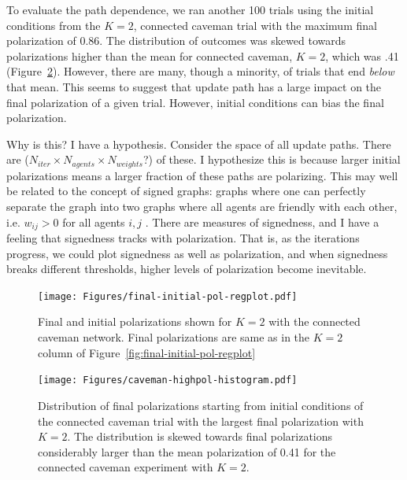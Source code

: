\documentclass[11pt,letterpaper]{article}
\begin{document}
To evaluate the path dependence, we ran another 100 trials using the initial
conditions from the $K=2$, connected caveman trial
with the maximum final polarization of 0.86. The distribution of outcomes was
skewed towards polarizations higher than the mean for connected caveman, $K=2$,
which was .41 (Figure~\ref{fig:highpol-histogram}). However, there are many,
though a minority, of trials that end \emph{below} that mean. This seems to
suggest that update path has a large impact on the final polarization of a
given trial. However, initial conditions can bias the final polarization. 

Why is this? I have a hypothesis. Consider the space of all update paths. 
There are ($N_{iter} \times N_{agents} \times N_{weights}$?) of these.
I hypothesize this is because larger initial polarizations means a larger
fraction of these paths are polarizing. This may well be related to the 
concept of signed graphs: graphs where one can perfectly separate the graph
into two graphs where all agents are friendly with each other, i.e. 
$w_{ij} > 0$ for all agents $i,j$ \cite{Altafini2012}. There are measures of
signedness, and I have a feeling that signedness tracks with polarization.
That is, as the iterations progress, we could plot signedness as well as 
polarization, and when signedness breaks different thresholds, higher levels of
polarization become inevitable.

\begin{figure}[h!]
  \centering
    \texttt{[image: Figures/final-initial-pol-regplot.pdf]}
  \caption{Final and initial polarizations shown for $K=2$ with the connected 
    caveman network. Final polarizations are same as in the $K=2$ column of 
    Figure~\ref{fig:final-initial-pol-regplot}}
  \label{fig:average-trial-caveman-over-k}
\end{figure}

\begin{figure}[h!]
  \centering
    \texttt{[image: Figures/caveman-highpol-histogram.pdf]}
  \caption{Distribution of final polarizations starting from initial conditions
  of the connected caveman trial with the largest final polarization with $K=2$.
  The distribution is skewed towards final polarizations considerably larger
  than the mean polarization of 0.41 for the connected caveman experiment
  with $K=2$.
  }
  \label{fig:highpol-histogram}
\end{figure}



\end{document}
